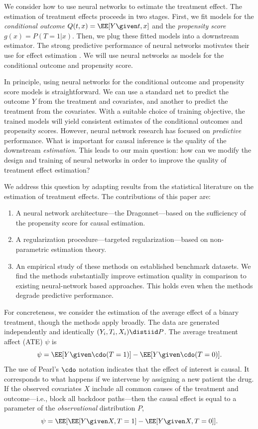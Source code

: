 \documentclass{article}
\begin{document}
We consider how to use neural networks to estimate the treatment effect.
The estimation of treatment effects proceeds in two stages.
First, we fit models for the \emph{conditional outcome} $Q(t,x) = \EE[Y\given t, x]$ and the \emph{propensity score} $g(x)= P(T=1|x)$.
Then, we plug these fitted models into a downstream estimator.
The strong predictive performance of neural networks motivates their use for effect estimation \citep[e.g.][]{shalit2016estimating,Johanssonlearning2016,louizos2017causal,AlaaCMPG2017,Alaadeep2017,Schwabperfect2018,Yoon2018GANITEEO,Farrell:Liang:Misra:2018}.
We will use neural networks as models for the conditional outcome and propensity score.



In principle, using neural networks for the conditional outcome and propensity score models is straightforward.
We can use a standard net to predict the outcome $Y$ from the treatment and covariates,
and another to predict the treatment from the covariates.
With a suitable choice of training objective, the trained models will yield
consistent estimates of the conditional outcomes and propensity scores.
However, neural network research has focused on \emph{predictive} performance. What is important for causal inference is the quality of the downstream \emph{estimation}.
This leads to our main question: how can we modify the design and training of neural networks
in order to improve the quality of treatment effect estimation?

We address this question by adapting results from the statistical literature on the estimation of treatment effects.
The contributions of this paper are:
\begin{enumerate}[nosep]
      \item A neural network architecture---the Dragonnet---based on the sufficiency of the propensity score for causal estimation.
      \item A regularization procedure---targeted regularization---based on non-parametric estimation theory. 
      \item An empirical study of these methods on established benchmark datasets.
        We find the methods substantially improve estimation quality in comparison to existing neural-network based approaches.
        This holds even when the methods degrade predictive performance. 
      \end{enumerate}
For concreteness, we consider the estimation of the average effect
of a binary treatment, though the methods apply broadly.
The data are generated independently and identically $(Y_{i},T_{i},X_{i}) \distiid P$.
The average treatment affect (ATE) $\psi$ is
\[
\psi=\EE[Y\given \cdo(T=1)]-\EE[Y\given \cdo(T=0)].
\]
The use of Pearl's $\cdo$ notation indicates that the effect of interest
is causal. It corresponds to what happens if we intervene by assigning a new patient the drug.
If the observed covariates $X$ include all common causes of the treatment and outcome---i.e.,
block all backdoor paths---then the causal effect is equal to
a parameter of the \emph{observational} distribution $P$,
\begin{equation}
\psi=\EE[\EE[Y\given X,T=1]-\EE[Y\given X,T=0]].\label{eq:psi_def}
\end{equation}
\end{document}
